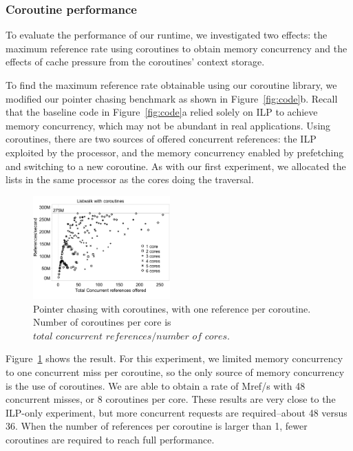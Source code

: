 \documentclass[10pt,nocopyrightspace]{sigplanconf}
\newcommand{\mrps}[1]{\unit[#1]{Mref/s}}
\begin{document}
\subsubsection{Coroutine performance}

To evaluate the performance of our runtime, we investigated two
effects: the maximum reference rate using coroutines
to obtain memory concurrency and the effects of cache pressure from the
coroutines' context storage. 

To find the maximum reference rate obtainable using our coroutine
library, we modified our pointer chasing benchmark as shown in
Figure~\ref{fig:code}b. Recall that the baseline code in Figure~\ref{fig:code}a relied solely on ILP to achieve memory concurrency, which may not be abundant in real applications. Using coroutines, there are two sources of offered
concurrent references: the ILP exploited by the processor, and the
memory concurrency enabled by prefetching and switching to a new
coroutine. As with our first experiment, we allocated the lists in the
same processor as the cores doing the traversal. 

\begin{figure}[t]
  \begin{center}
    \includegraphics[width=0.47\textwidth]{figures/multi-green-edited.pdf}
  \end{center}
  \caption{Pointer chasing with coroutines, with one reference per
    coroutine. Number of coroutines per core is $\textit{total concurrent references} / \textit{number of cores}$.}
  \label{fig:multi-green}
\end{figure}

Figure~\ref{fig:multi-green} shows the result. For this
experiment, we limited memory concurrency to one concurrent miss per
coroutine, so the only source of memory concurrency is the use of
coroutines. We are able to obtain a rate of \mrps{275} with 48 concurrent misses, or 8 coroutines per core. These
results are very close to the ILP-only experiment, but more concurrent requests are required--about 48 versus 36. When the number of references per coroutine is larger than 1, fewer coroutines are required to reach full performance.
\end{document}
